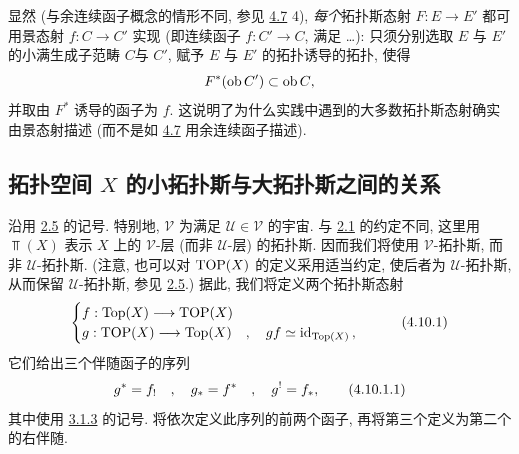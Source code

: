 \subsubsection{}
显然 (与余连续函子概念的情形不同, 参见 \hyperref[IV.subsec4.7]{4.7} 4), \emph{每个}拓扑斯态射 $F:E\rightarrow E'$ 都可用景态射 $f:C\rightarrow C'$ 实现 (即连续函子 $f:C'\rightarrow C$, 满足 \ldots): 只须分别选取 $E$ 与 $E'$ 的小满生成子范畴 $C$\pageoriginale 与 $C'$, 赋予 $E$ 与 $E'$ 的拓扑诱导的拓扑, 使得
$$
F^{\ast}(\operatorname{ob} C')\subset \operatorname{ob} C{},
$$
并取由 $F^{\ast}$ 诱导的函子为 $f$. 这说明了为什么实践中遇到的大多数拓扑斯态射确实由景态射描述 (而不是如 \hyperref[IV.subsec4.7]{4.7} 用余连续函子描述).




\subsection{拓扑空间 $X$ 的小拓扑斯与大拓扑斯之间的关系}

沿用 \hyperref[IV.subsec2.5]{2.5} 的记号. 特别地, $𝒱$ 为满足 $𝒰\in 𝒱$ 的宇宙. 与 \hyperref[IV.subsec2.1]{2.1} 的约定不同, 这里用 $\Top(X)$ 表示 $X$ 上的 $𝒱$-层 (而非 $𝒰$-层) 的拓扑斯. 因而我们将使用 $𝒱$-拓扑斯, 而非 $𝒰$-拓扑斯. (注意, 也可以对 $\operatorname{TOP}(X)$ 的定义采用适当约定, 使后者为 $𝒰$-拓扑斯, 从而保留 $𝒰$-拓扑斯, 参见 \hyperref[IV.subsec2.5]{2.5}.) 据此, 我们将定义两个拓扑斯态射
\begin{equation*}
\begin{cases}
 f: \operatorname{Top}(X)\longrightarrow \operatorname{TOP}(X)\\
 g: \operatorname{TOP}(X)\longrightarrow \operatorname{Top}(X)\quad,\quad gf\simeq \operatorname{id}_{\operatorname{Top}(X)}{},
\end{cases}\tag{4.10.1}
\end{equation*}
它们给出三个伴随函子的序列
\begin{equation*}
g^{\ast}=f_{!}\quad,\quad g_{\ast}=f^{\ast}\quad,\quad
g^{!}=f_{\ast}{},\tag{4.10.1.1}
\end{equation*}
其中使用 \hyperref[IV.subsubsec3.1.3]{3.1.3} 的记号. 将依次定义\pageoriginale 此序列的前两个函子, 再将第三个定义为第二个的右伴随.

\setcounter{subsubsection}{1}
